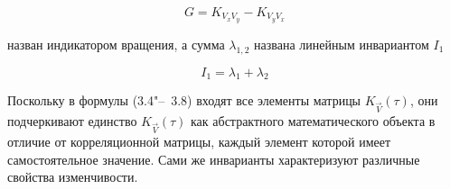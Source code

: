 \begin{equation}
\label{eq:equation3_7}
G=K_{{V_{x}V_{y}}}-K_{{V_{y}V_{x}}}
\end{equation} 

назван индикатором вращения, а сумма $\lambda_{1,2}$ названа линейным инвариантом $I_1$ 

\begin{equation}
\label{eq:equation3_8}
I_1=\lambda_{1}+\lambda_{2}
\end{equation}

Поскольку в формулы (3.4"--~3.8) входят все элементы матрицы $K_{\vec{V}}(\tau)$, они подчеркивают единство $K_{\vec{V}}(\tau)$ как абстрактного математического объекта в отличие от корреляционной матрицы, каждый элемент которой имеет самостоятельное значение. Сами же инварианты характеризуют различные свойства изменчивости.
